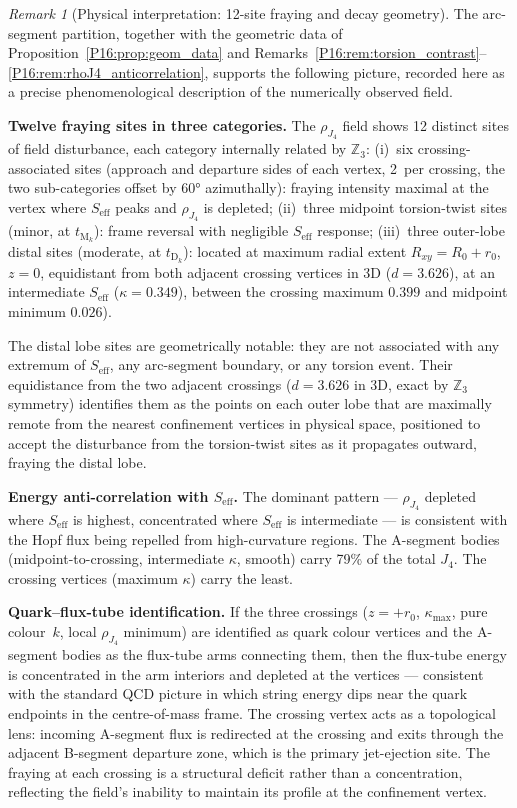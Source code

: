 \documentclass[11pt,a4paper]{article}
\theoremstyle{definition}\newtheorem{definition}[theorem]{Definition}
\theoremstyle{remark}
\newtheorem{remark}[theorem]{Remark}
\theoremstyle{definition}\newtheorem{construction}[theorem]{Construction}
\begin{document}
\begin{remark}[Physical interpretation: 12-site fraying and decay geometry]
\label{P16:rem:arcseg_physics}
The arc-segment partition, together with the geometric data of
Proposition~\ref{P16:prop:geom_data} and
Remarks~\ref{P16:rem:torsion_contrast}--\ref{P16:rem:rhoJ4_anticorrelation},
supports the following picture, recorded here as a precise
phenomenological description of the numerically observed field.

\textbf{Twelve fraying sites in three categories.}
The $\rho_{J_4}$ field shows 12 distinct sites of field disturbance,
each category internally related by $\mathbb{Z}_3$:
(i)~six crossing-associated sites (approach and departure sides of each
vertex, 2~per crossing, the two sub-categories offset by 60°
azimuthally): fraying intensity maximal at the vertex where $S_{\mathrm{eff}}$
peaks and $\rho_{J_4}$ is depleted;
(ii)~three midpoint torsion-twist sites (minor, at $t_{\mathrm{M}_k}$):
frame reversal with negligible $S_{\mathrm{eff}}$ response;
(iii)~three outer-lobe distal sites (moderate, at $t_{\mathrm{D}_k}$):
located at maximum radial extent $R_{xy}=R_0+r_0$, $z=0$, equidistant
from both adjacent crossing vertices in 3D ($d=3.626$), at an intermediate
$S_{\mathrm{eff}}$ ($\kappa=0.349$), between the crossing maximum $0.399$
and midpoint minimum $0.026$).

The distal lobe sites are geometrically notable: they are not associated
with any extremum of $S_{\mathrm{eff}}$, any arc-segment boundary, or any
torsion event.  Their equidistance from the two adjacent crossings
($d=3.626$ in 3D, exact by $\mathbb{Z}_3$ symmetry) identifies them as
the points on each outer lobe that are maximally remote from the nearest
confinement vertices in physical space, positioned to accept the disturbance
from the torsion-twist sites as it propagates outward, fraying the distal lobe.

\textbf{Energy anti-correlation with $S_{\mathrm{eff}}$.}
The dominant pattern --- $\rho_{J_4}$ depleted where $S_{\mathrm{eff}}$
is highest, concentrated where $S_{\mathrm{eff}}$ is intermediate ---
is consistent with the Hopf flux being repelled from high-curvature
regions.  The A-segment bodies (midpoint-to-crossing, intermediate
$\kappa$, smooth) carry 79\% of the total $J_4$.  The crossing vertices
(maximum $\kappa$) carry the least.

\textbf{Quark--flux-tube identification.}
If the three crossings ($z=+r_0$, $\kappa_{\max}$, pure colour~$k$,
local $\rho_{J_4}$ minimum) are identified as quark colour vertices
and the A-segment bodies as the flux-tube arms connecting them, then
the flux-tube energy is concentrated in the arm interiors and depleted
at the vertices --- consistent with the standard QCD picture in which
string energy dips near the quark endpoints in the centre-of-mass
frame.  The crossing vertex acts as a topological lens: incoming
A-segment flux is redirected at the crossing and exits through the
adjacent B-segment departure zone, which is the primary jet-ejection
site.  The fraying at each crossing is a structural deficit rather
than a concentration, reflecting the field's inability to maintain
its profile at the confinement vertex.


\end{remark}
\end{document}
